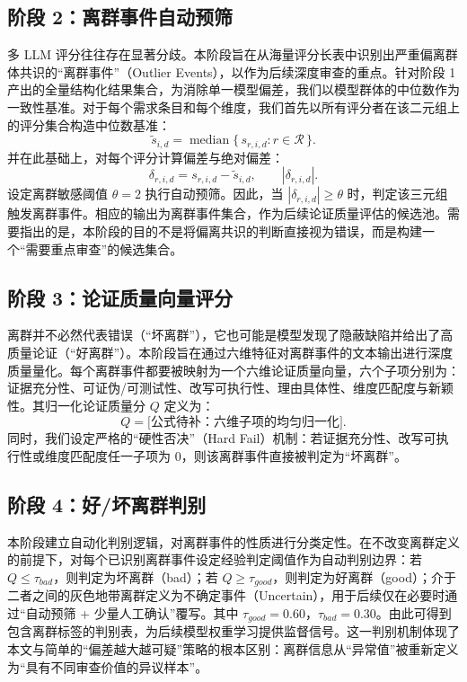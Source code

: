 \documentclass[a4paper,11pt]{ctexart}
\begin{document}
\subsection{阶段 2：离群事件自动预筛}
多 LLM 评分往往存在显著分歧。本阶段旨在从海量评分长表中识别出严重偏离群体共识的“离群事件”（Outlier Events），以作为后续深度审查的重点。针对阶段 1 产出的全量结构化结果集合，为消除单一模型偏差，我们以模型群体的中位数作为一致性基准。对于每个需求条目和每个维度，我们首先以所有评分者在该二元组上的评分集合构造中位数基准：
\begin{equation}
\tilde{s}_{i,d} = \operatorname{median}\{\, s_{r,i,d} : r \in \mathcal{R} \,\}.
\end{equation}
并在此基础上，对每个评分计算偏差与绝对偏差：
\begin{equation}
\delta_{r,i,d} = s_{r,i,d} - \tilde{s}_{i,d}, \qquad |\delta_{r,i,d}|.
\end{equation}
设定离群敏感阈值 $\theta=2$ 执行自动预筛。因此，当 $|\delta_{r,i,d}| \ge \theta$ 时，判定该三元组触发离群事件。相应的输出为离群事件集合，作为后续论证质量评估的候选池。需要指出的是，本阶段的目的不是将偏离共识的判断直接视为错误，而是构建一个“需要重点审查”的候选集合。

\subsection{阶段 3：论证质量向量评分}
离群并不必然代表错误（“坏离群”），它也可能是模型发现了隐蔽缺陷并给出了高质量论证（“好离群”）。本阶段旨在通过六维特征对离群事件的文本输出进行深度质量量化。每个离群事件都要被映射为一个六维论证质量向量，六个子项分别为：证据充分性、可证伪/可测试性、改写可执行性、理由具体性、维度匹配度与新颖性。其归一化论证质量分 $Q$ 定义为：
\begin{equation}
Q = \text{[公式待补：六维子项的均匀归一化]}.
\end{equation}
同时，我们设定严格的“硬性否决”（Hard Fail）机制：若证据充分性、改写可执行性或维度匹配度任一子项为 $0$，则该离群事件直接被判定为“坏离群”。

\subsection{阶段 4：好/坏离群判别}
本阶段建立自动化判别逻辑，对离群事件的性质进行分类定性。在不改变离群定义的前提下，对每个已识别离群事件设定经验判定阈值作为自动判别边界：若 $Q \le \tau_{bad}$，则判定为坏离群（bad）；若 $Q \ge \tau_{good}$，则判定为好离群（good）；介于二者之间的灰色地带离群定义为不确定事件（Uncertain），用于后续仅在必要时通过“自动预筛 + 少量人工确认”覆写。其中 $\tau_{good}=0.60$，$\tau_{bad}=0.30$。由此可得到包含离群标签的判别表，为后续模型权重学习提供监督信号。这一判别机制体现了本文与简单的“偏差越大越可疑”策略的根本区别：离群信息从“异常值”被重新定义为“具有不同审查价值的异议样本”。
\end{document}

